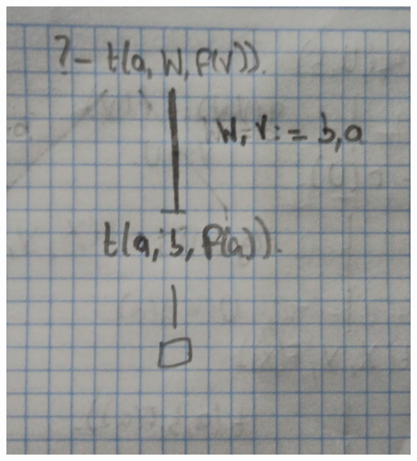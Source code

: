 \documentclass[11pt,letterpaper]{article}
\begin{document}
\begin{enumerate}
\begin{enumerate}
    \begin{center}
      \includegraphics[scale=0.12]{E2}
    \end{center}
\end{enumerate}

\end{enumerate}
\end{document}

